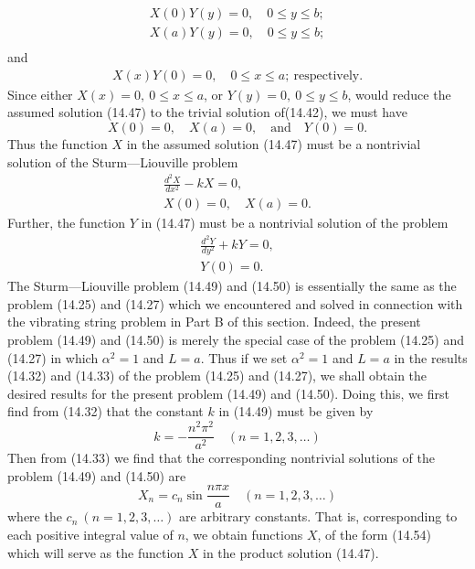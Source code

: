\documentclass[11pt,a4paper, twoside]{report}
\begin{document}
	\begin{align*}
		X(0)Y(y) = 0, \quad 0 \leq y \leq b;\\
		X(a)Y(y) = 0, \quad 0 \leq y \leq b;\\
	\end{align*}
	and
	\begin{align*}
		X(x)Y(0) = 0, \quad 0 \leq x \leq a;\ \text{respectively}.
	\end{align*}
	Since either $X(x) = 0,\ 0\leq x \leq a$, or $Y(y) = 0,\ 0 \leq y \leq b$, would reduce the assumed solution (14.47) to the trivial solution of(14.42), we must have
	$$
	X(0) = 0,\quad X(a) = 0,\quad \text{and}\quad Y(0) = 0.
	$$
	Thus the function $X$ in the assumed solution (14.47) must be a nontrivial solution of the Sturm—Liouville problem
	\begin{align}
		\tag{14.49}
		\frac{d^2X}{dx^2} - kX = 0,\\
		\tag{14.50}
		X(0) = 0,\quad X(a) = 0.
	\end{align}
	Further, the function $Y$ in (14.47) must be a nontrivial solution of the problem
	\begin{align}
		\tag{14.51}
		\frac{d^2 Y}{dy^2} + kY = 0,\\
		\tag{14.52}
		Y(0) = 0.
	\end{align}
	The Sturm—Liouville problem (14.49) and (14.50) is essentially the same as the problem (14.25) and (14.27) which we encountered and solved in connection with the vibrating string problem in Part B of this section. Indeed, the present problem (14.49) and (14.50) is merely the special case of the problem (14.25) and (14.27) in which $\alpha^2 = 1$ and $L = a$. Thus if we set $\alpha^2 = 1$ and $L = a$ in the results (14.32) and (14.33) of the problem (14.25) and (14.27), we shall obtain the desired results for the present problem (14.49) and (14.50). Doing this, we first find from (14.32) that the constant $k$ in (14.49) must be given by
	\begin{equation}\tag{14.53}
		k = -\frac{n^2\pi^2}{a^2}\quad (n = 1,2,3,\ldots)
	\end{equation}
	Then from (14.33) we find that the corresponding nontrivial solutions of the problem (14.49) and (14.50) are
	\begin{equation}\tag{14.54}
		X_n = c_n\sin\frac{n\pi x}{a}\quad (n=1,2,3,\ldots)
	\end{equation}
	where the $c_n\ (n = 1, 2, 3, \ldots)$ are arbitrary constants. That is, corresponding to each positive integral value of $n$, we obtain functions $X$, of the form (14.54)  which will serve as the function $X$ in the product solution (14.47).\\
\end{document}
